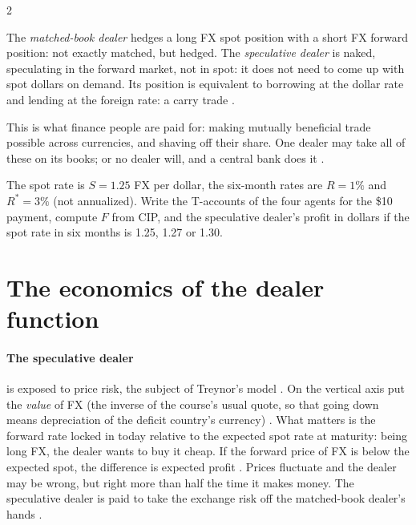\begin{paracol}{2}
\begin{definition}
The \emph{matched-book dealer} hedges a long FX spot position with a short FX forward position: not exactly matched, but hedged. The \emph{speculative dealer} is
naked, speculating in the forward market, not in spot: it does not need to come up with spot dollars on demand. Its position is equivalent to borrowing at the
dollar rate and lending at the foreign rate: a carry trade .
\end{definition}

This is what finance people are paid for: making mutually beneficial trade possible across currencies, and shaving off their share. One dealer may take all of
these on its books; or no dealer will, and a central bank does it .

\begin{exercise}
The spot rate is $S=1.25$ FX per dollar, the six-month rates are $R=1\%$ and $R^\ast=3\%$ (not annualized). Write the T-accounts of the four agents for the \$10
payment, compute $F$ from CIP, and the speculative dealer's profit in dollars if the spot rate in six months is 1.25, 1.27 or 1.30.
\end{exercise}

\section{The economics of the dealer function}\label{sec:fx-dealers}

\paragraph{The speculative dealer} is exposed to price risk, the subject of Treynor's model . On the vertical axis put the \emph{value} of FX (the
inverse of the course's usual quote, so that going down means depreciation of the deficit country's currency) .
What matters is the forward rate locked in today relative to the expected spot rate at maturity: being long FX, the dealer wants to buy it cheap. If the forward
price of FX is below the expected spot, the difference is expected profit .
Prices fluctuate and the dealer may be wrong, but right more than half the time it makes money. The speculative dealer is paid to take the exchange risk off the
matched-book dealer's hands .


\end{paracol}
